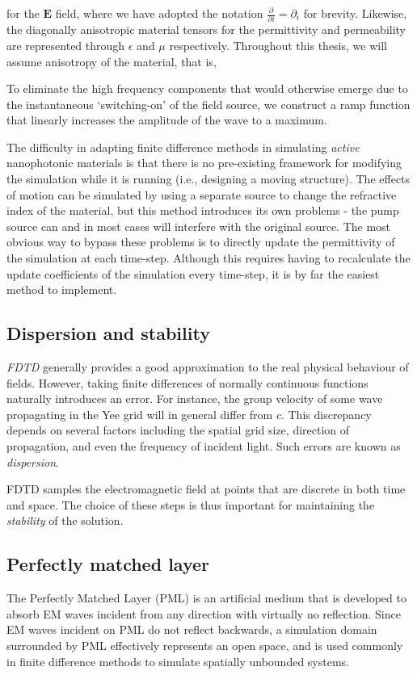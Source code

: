 for the $\bm{E}$ field, where we have adopted the notation $\frac{\partial}{\partial i} = \partial_i$ for brevity. Likewise, the diagonally anisotropic material tensors for the permittivity and permeability are represented through $\epsilon$ and $\mu$ respectively. Throughout this thesis, we will assume anisotropy of the material, that is, 

To eliminate the high frequency components that would otherwise emerge due to the instantaneous `switching-on' of the field source, we construct a ramp function that linearly increases the amplitude of the wave to a maximum. 

The difficulty in adapting finite difference methods in simulating \textit{active} nanophotonic materials is that there is no pre-existing framework for modifying the simulation while it is running (i.e., designing a moving structure). The effects of motion can be simulated by using a separate source to change the refractive index of the material, but this method introduces its own problems - the pump source can and in most cases will interfere with the original source. The most obvious way to bypass these problems is to directly update the permittivity of the simulation at each time-step. Although this requires having to recalculate the update coefficients of the simulation every time-step, it is by far the easiest method to implement. 

\subsection{Dispersion and stability}
\textit{FDTD} generally provides a good approximation to the real physical behaviour of fields. However, taking finite differences of normally continuous functions naturally introduces an error. For instance, the group velocity of some wave propagating in the Yee grid will in general differ from $c$. This discrepancy depends on several factors including the spatial grid size, direction of propagation, and even the frequency of incident light. Such errors are known as \textit{dispersion}.

FDTD samples the electromagnetic field at points that are discrete in both time and space. The choice of these steps is thus important for maintaining the \textit{stability} of the solution. 

\subsection{Perfectly matched layer}
The Perfectly Matched Layer (PML) is an artificial medium that is developed to absorb EM waves incident from any direction with virtually no reflection. Since EM waves incident on PML do not reflect backwards, a simulation domain surrounded by PML effectively represents an open space, and is used commonly in finite difference methods to simulate spatially unbounded systems.

